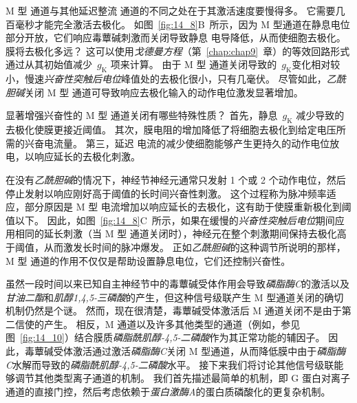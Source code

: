 M 型  通道与其他延迟整流  通道的不同之处在于其激活速度要慢得多。
它需要几百毫秒才能完全激活去极化。
如图~\ref{fig:14_8}B~所示，因为 M 型通道在静息电位部分开放，它们响应毒蕈碱刺激而关闭导致静息  电导降低，从而使细胞去极化。
膜将去极化多远？
这可以使用\textit{戈德曼方程}（第~\ref{chap:chap9}~章）的等效回路形式通过从其初始值减少~$g_\text{K}$ 项来计算。
由于 M 型  通道关闭导致的~$g_\text{K}$变化相对较小，慢速\textit{兴奋性突触后电位}峰值处的去极化很小，只有几毫伏。
尽管如此，\textit{乙酰胆碱}关闭 M 型  通道可导致响应去极化输入的动作电位激发显著增加。


显著增强兴奋性的 M 型  通道关闭有哪些特殊性质？
首先，静息~$g_\text{K}$ 减少导致的去极化使膜更接近阈值。
其次，膜电阻的增加降低了将细胞去极化到给定电压所需的兴奋电流量。
第三，延迟  电流的减少使细胞能够产生更持久的动作电位放电，以响应延长的去极化刺激。


在没有\textit{乙酰胆碱}的情况下，神经节神经元通常只发射 1 个或 2 个动作电位，然后停止发射以响应刚好高于阈值的长时间兴奋性刺激。
这个过程称为脉冲频率适应，部分原因是 M 型  电流增加以响应延长的去极化，这有助于使膜重新极化到阈值以下。
因此，如图~\ref{fig:14_8}C~所示，如果在缓慢的\textit{兴奋性突触后电位}期间应用相同的延长刺激（当 M 型  通道关闭时），神经元在整个刺激期间保持去极化高于阈值，从而激发长时间的脉冲爆发。
正如\textit{乙酰胆碱}的这种调节所说明的那样，M 型  通道的作用不仅仅是帮助设置静息电位，它们还控制兴奋性。


虽然一段时间以来已知自主神经节中的毒蕈碱受体作用会导致\textit{磷脂酶C}的激活以及\textit{甘油二酯}和\textit{肌醇1,4,5-三磷酸}的产生，但这种信号级联产生 M 型通道关闭的确切机制仍然是个谜。
然而，现在很清楚，毒蕈碱受体激活后 M 通道关闭不是由于第二信使的产生。
相反，M 通道以及许多其他类型的通道（例如，参见图~\ref{fig:14_10}）结合膜质\textit{磷脂酰肌醇-4,5-二磷酸}作为其正常功能的辅因子。
因此，毒蕈碱受体激活通过激活\textit{磷脂酶C}关闭 M 型通道，从而降低膜中由于\textit{磷脂酶C}水解而导致的\textit{磷脂酰肌醇-4,5-二磷酸}水平。
接下来我们将讨论其他信号级联能够调节其他类型离子通道的机制。
我们首先描述最简单的机制，即 G 蛋白对离子通道的直接门控，然后考虑依赖于\textit{蛋白激酶A}的蛋白质磷酸化的更复杂机制。


